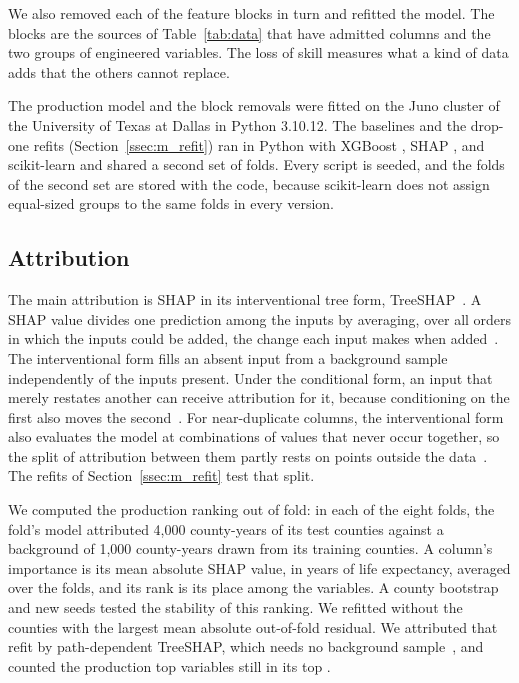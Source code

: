 \documentclass[sensors,article,submit,moreauthors,pdftex]{Definitions/mdpi}
\begin{document}
We also removed each of the \LOOnModalities{} feature blocks in turn and
refitted the model. The blocks are the
sources of Table~\ref{tab:data} that have admitted columns and the two groups
of engineered variables. The loss of skill measures what a kind of data adds
that the others cannot replace.

The production model and the block removals were fitted on the Juno cluster of the
University of Texas at Dallas in Python 3.10.12. The baselines and the drop-one refits
(Section~\ref{ssec:m_refit}) ran in Python \VerPython{} with XGBoost
\VerXgb{}, SHAP \VerShap{}, and scikit-learn \VerSklearn{} and shared a second
set of folds. Every script is seeded, and the folds of the second set are stored with
the code, because scikit-learn does not assign equal-sized groups to the same
folds in every version.

\subsection{Attribution}
\label{ssec:m_attribution}
The main attribution is SHAP in its
interventional tree form, TreeSHAP~\cite{Lundberg2017, Lundberg2020,
Janzing2020}. A SHAP value divides one prediction among the inputs by
averaging, over all orders in which the inputs could be added, the change each
input makes when added~\cite{Shapley1953}. The interventional form fills an absent input from a
background sample independently of the inputs present. Under the conditional form, an input that
merely restates another can receive attribution for it, because
conditioning on the first also moves the second~\cite{Janzing2020}. For near-duplicate
columns, the interventional form also evaluates the model at combinations of
values that never occur together, so the split of attribution between them partly
rests on points outside the data~\cite{Kumar2020, Hooker2021}. The refits of Section~\ref{ssec:m_refit}
test that split.

We computed the
production ranking out of fold: in each of the eight folds, the fold's model
attributed 4,000 county-years of its test counties against a background of
1,000 county-years drawn from its training counties. A column's importance is
its mean absolute SHAP value, in years of life expectancy, averaged over the
folds, and its rank is its place among the \Nfeatpruned{} variables. A county
bootstrap and new seeds tested the stability of this ranking. We refitted without the
\InflDropN{} counties with the largest mean absolute out-of-fold residual. We
attributed that refit by path-dependent TreeSHAP, which needs no background
sample~\cite{Lundberg2020}, and counted the production top \InflTopK{} variables still in
its top \InflTopK{}.
\end{document}
